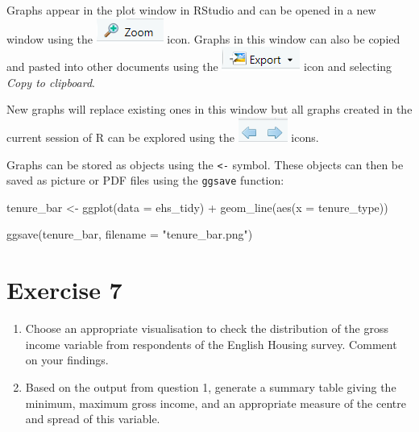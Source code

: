 \documentclass[
  letterpaper,
  DIV=11,
  numbers=noendperiod]{scrreprt}
\newenvironment{Shaded}{\begin{snugshade}}{\end{snugshade}}
\newcommand{\AttributeTok}[1]{\textcolor[rgb]{0.40,0.45,0.13}{#1}}
\newcommand{\FunctionTok}[1]{\textcolor[rgb]{0.28,0.35,0.67}{#1}}
\newcommand{\NormalTok}[1]{\textcolor[rgb]{0.00,0.23,0.31}{#1}}
\newcommand{\OtherTok}[1]{\textcolor[rgb]{0.00,0.23,0.31}{#1}}
\newcommand{\SpecialCharTok}[1]{\textcolor[rgb]{0.37,0.37,0.37}{#1}}
\newcommand{\StringTok}[1]{\textcolor[rgb]{0.13,0.47,0.30}{#1}}
\providecommand{\tightlist}{%
  \setlength{\itemsep}{0pt}\setlength{\parskip}{0pt}}\usepackage{longtable,booktabs,array}
\begin{document}
Graphs appear in the plot window in RStudio and can be opened in a new
window using the \includegraphics{img/zoom_shortcut.png} icon. Graphs in
this window can also be copied and pasted into other documents using the
\includegraphics{img/export_shortcut.png} icon and selecting \emph{Copy
to clipboard}.

New graphs will replace existing ones in this window but all graphs
created in the current session of R can be explored using the
\includegraphics{img/arrow_shortcut.png} icons.

Graphs can be stored as objects using the \texttt{\textless{}-} symbol.
These objects can then be saved as picture or PDF files using the
\texttt{ggsave} function:

\begin{Shaded}
\begin{Highlighting}[]
\NormalTok{tenure\_bar }\OtherTok{\textless{}{-}} \FunctionTok{ggplot}\NormalTok{(}\AttributeTok{data =}\NormalTok{ ehs\_tidy) }\SpecialCharTok{+}
  \FunctionTok{geom\_line}\NormalTok{(}\FunctionTok{aes}\NormalTok{(}\AttributeTok{x =}\NormalTok{ tenure\_type))}

\FunctionTok{ggsave}\NormalTok{(tenure\_bar, }\AttributeTok{filename =} \StringTok{"tenure\_bar.png"}\NormalTok{)}
\end{Highlighting}
\end{Shaded}

\section{Exercise 7}\label{exercise-7}

\begin{enumerate}
\def\labelenumi{\arabic{enumi}.}
\tightlist
\item
  Choose an appropriate visualisation to check the distribution of the
  gross income variable from respondents of the English Housing survey.
  Comment on your findings.
\item
  Based on the output from question 1, generate a summary table giving
  the minimum, maximum gross income, and an appropriate measure of the
  centre and spread of this variable.
\end{enumerate}
\end{document}
